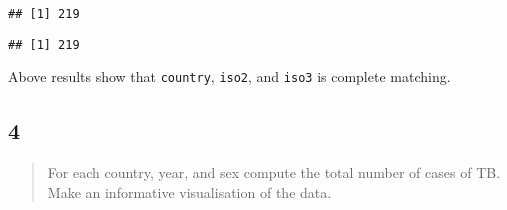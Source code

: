 \documentclass[]{ltjsarticle}
\newenvironment{Shaded}{\begin{snugshade}}{\end{snugshade}}
\newcommand{\KeywordTok}[1]{\textcolor[rgb]{0.13,0.29,0.53}{\textbf{#1}}}
\newcommand{\NormalTok}[1]{#1}
\newcommand{\OperatorTok}[1]{\textcolor[rgb]{0.81,0.36,0.00}{\textbf{#1}}}
\newcommand{\StringTok}[1]{\textcolor[rgb]{0.31,0.60,0.02}{#1}}
\begin{document}
\begin{Shaded}
\end{Shaded}

\begin{verbatim}
## [1] 219
\end{verbatim}

\begin{Shaded}
\end{Shaded}

\begin{verbatim}
## [1] 219
\end{verbatim}

Above results show that \texttt{country}, \texttt{iso2}, and
\texttt{iso3} is complete matching.

\hypertarget{section-20}{%
\subsection{4}\label{section-20}}

\begin{quote}
For each country, year, and sex compute the total number of cases of TB.
Make an informative visualisation of the data.
\end{quote}
\end{document}

